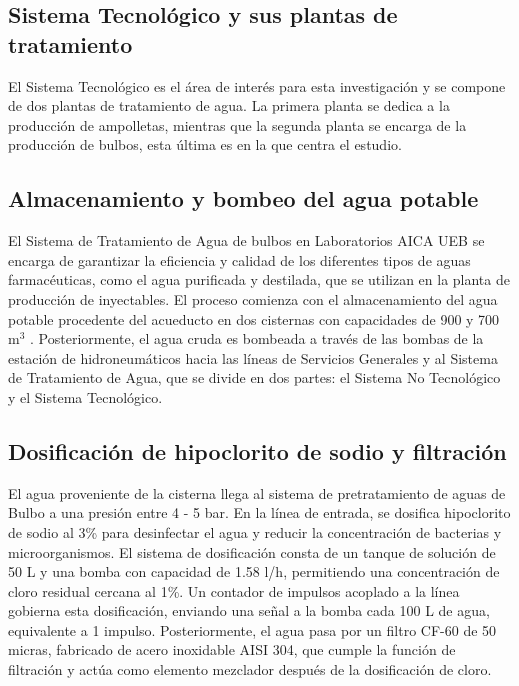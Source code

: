 
\subsection*{Sistema Tecnológico y sus plantas de tratamiento}

El Sistema Tecnológico es el área de interés para esta investigación y se compone de dos plantas de tratamiento de agua.
La primera planta se dedica a la producción de ampolletas, mientras que la segunda planta se encarga de la producción de bulbos, esta última es en la que centra el estudio.



\subsection*{Almacenamiento y bombeo del agua potable}

El Sistema de Tratamiento de Agua de bulbos en Laboratorios AICA UEB se encarga de garantizar la eficiencia y calidad de los
diferentes tipos de aguas farmacéuticas, como el agua purificada y destilada, que se utilizan en la planta de producción de inyectables.
El proceso comienza con el almacenamiento del agua potable procedente del acueducto en dos cisternas con capacidades de 900 y 700 m$^3$ .
Posteriormente, el agua cruda es bombeada a través de las bombas de la estación de hidroneumáticos hacia las líneas de Servicios Generales y
al Sistema de Tratamiento de Agua, que se divide en dos partes: el Sistema No Tecnológico y el Sistema Tecnológico.


\subsection*{Dosificación de hipoclorito de sodio y filtración}

El agua proveniente de la cisterna llega al sistema de pretratamiento de aguas de Bulbo a una presión entre 4 - 5 bar. En la línea de entrada, se
dosifica hipoclorito de sodio al 3\% para desinfectar el agua y reducir la concentración de bacterias y microorganismos. El sistema de dosificación consta de un
tanque de solución de 50 L y una bomba con capacidad de 1.58 l/h, permitiendo una concentración de cloro residual cercana al 1\%.
Un contador de impulsos acoplado a la línea gobierna esta dosificación, enviando una señal a la bomba cada 100 L de agua, equivalente a 1
impulso. Posteriormente, el agua pasa por un filtro CF-60 de 50 micras, fabricado de acero inoxidable AISI 304, que cumple la función de
filtración y actúa como elemento mezclador después de la dosificación de cloro.

